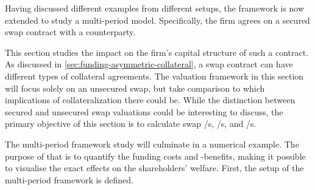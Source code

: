 \documentclass[main.tex]{subfiles}
\begin{document}
    Having discussed different examples from different setups,
    the framework is now extended to study a multi-period model.
    Specifically, the firm agrees on a secured swap contract with a counterparty.
    
    This section studies the impact on the firm's capital structure of such a contract.
    As discussed in \cref{sec:funding-asymmetric-collateral}, a swap contract can have different types of collateral agreements.
    The valuation framework in this section will focus solely on an unsecured swap,
    but take comparison to which implications of collateralization there could be.
    While the distinction between secured and unsecured swap valuations could be interesting to discuss,
    the primary objective of this section is to calculate swap \FVA/s, \CVA/s, and \DVA/s.

    The multi-period framework study will culminate in a numerical example.
    The purpose of that is to quantify the funding costs and -benefits,
    making it possible to visualise the exact effects on the shareholders' welfare.
    First, the setup of the multi-period framework is defined.
\end{document}

